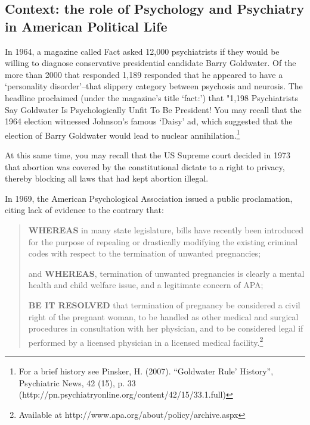 \begin{refsection}
\subsection{Context: the role of Psychology and Psychiatry in American Political Life}
\label{context:theroleofpsychologyandpsychiatryinamericanpoliticallife}

In 1964, a magazine called Fact asked 12,000 psychiatrists if they would be willing to diagnose conservative presidential candidate Barry Goldwater. Of the more than 2000 that responded 1,189 responded that he appeared to have a `personality disorder'--that slippery category between psychosis and neurosis. The headline proclaimed (under the magazine's title `fact:') that "1,198 Psychiatrists Say Goldwater Is Psychologically Unfit To Be President! You may recall that the 1964 election witnessed Johnson's famous `Daisy' ad, which suggested that the election of Barry Goldwater would lead to nuclear annihilation.\footnote{For a brief history see Pinsker, H. (2007). ``Goldwater Rule' History'', Psychiatric News, 42 (15), p. 33 (http:\slash \slash pn.psychiatryonline.org\slash content\slash 42\slash 15\slash 33.1.full)} 

At this same time, you may recall that the US Supreme court decided in 1973 that abortion was covered by the constitutional dictate to a right to privacy, thereby blocking all laws that had kept abortion illegal.

In 1969, the American Psychological Association issued a public proclamation, citing lack of evidence to the contrary that:

\begin{quote}

\textbf{WHEREAS} in many state legislature, bills have recently been introduced for the purpose of repealing or drastically modifying the existing criminal codes with respect to the termination of unwanted pregnancies;

and \textbf{WHEREAS}, termination of unwanted pregnancies is clearly a mental health and child welfare issue, and a legitimate concern of APA;

\textbf{BE IT RESOLVED} that termination of pregnancy be considered a civil right of the pregnant woman, to be handled as other medical and surgical procedures in consultation with her physician, and to be considered legal if performed by a licensed physician in a licensed medical facility.\footnote{Available at http:\slash \slash www.apa.org\slash about\slash policy\slash archive.aspx}
\end{quote}


\end{refsection}
